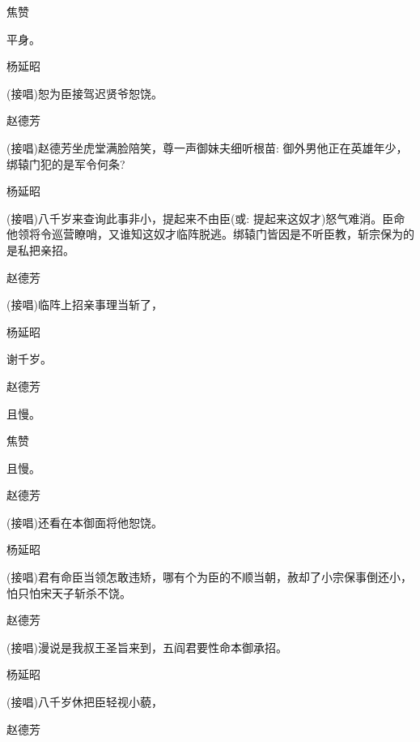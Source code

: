 {焦赞\hspace{30pt}~

平身。

杨延昭\hspace{20pt}~

(接唱)恕为臣接驾迟贤爷恕饶。

赵德芳

(接唱)赵德芳坐虎堂满脸陪笑，尊一声御妹夫细听根苗: 御外男他正在英雄年少，绑辕门犯的是军令何条?

杨延昭

(接唱)八千岁来查询此事非小，提起来不由臣({\akai 或}: 提起来这奴才)怒气难消。臣命他领将令巡营瞭哨，又谁知这奴才临阵脱逃。绑辕门皆因是不听臣教，斩宗保为的是私把亲招。

赵德芳\hspace{20pt}~

(接唱)临阵上招亲事理当斩了，

杨延昭\hspace{20pt}~

谢千岁。

赵德芳\hspace{20pt}~

且慢。

焦赞\hspace{30pt}~

且慢。

赵德芳\hspace{20pt}~

(接唱)还看在本御面将他恕饶。

杨延昭

(接唱)君有命臣当领怎敢违矫，哪有个为臣的不顺当朝，赦却了小宗保事倒还小，怕只怕宋天子斩杀不饶。

赵德芳\hspace{20pt}~

(接唱)漫说是我叔王圣旨来到，五阎君要性命本御承招。

杨延昭\hspace{20pt}~

(接唱)八千岁休把臣轻视小藐，


赵德芳


}
